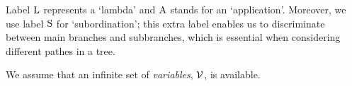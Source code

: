 \documentclass{article}
\theoremstyle{plain}
\theoremstyle{definition}
\begin{document}
Label ${\rm L}$ represents a `lambda' and ${\rm A}$ stands for an `application'. Moreover, we use label ${\rm S}$ for `subordination'; this extra label enables us to discriminate between main branches and subbranches, which is essential when considering different pathes in a tree.

\smallskip

We assume that an infinite set of {\em variables\/}, ${{\cal V}}$, is available.












\end{document}

